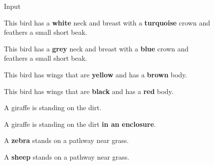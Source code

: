 \documentclass{article}
\begin{document}
\begin{figure}[t]
\begin{minipage}{0.12\textwidth}\raggedright
\scriptsize{Input}\\
\end{minipage}
\quad\begin{minipage}{0.10\textwidth}
\centering
\tiny{This bird has a \textbf{white} neck and breast with a \textbf{turquoise} crown and feathers a small short beak.}
\end{minipage}
\noindent\begin{minipage}{0.10\textwidth}
\centering
\tiny{This bird has a \textbf{grey} neck and breast with a \textbf{blue} crown and feathers a small short beak.}
\end{minipage}
\noindent\begin{minipage}{0.10\textwidth}
\centering
\tiny{This bird has wings that are \textbf{yellow} and has a \textbf{brown} body.}
\end{minipage}
\noindent\begin{minipage}{0.10\textwidth}
\centering
\tiny{This bird has wings that are \textbf{black} and has a \textbf{red} body.}
\end{minipage}
\noindent\begin{minipage}{0.10\textwidth}
\centering
\tiny{A giraffe is standing on the dirt.}
\end{minipage}
\noindent\begin{minipage}{0.10\textwidth}
\centering
\tiny{A giraffe is standing on the dirt \textbf{in an enclosure}.}
\end{minipage}
\noindent\begin{minipage}{0.10\textwidth}
\centering
\tiny{A \textbf{zebra} stands on a pathway near grass.}
\end{minipage}
\noindent\begin{minipage}{0.10\textwidth}
\centering
\tiny{A \textbf{sheep} stands on a pathway near grass.}
\end{minipage}
\smallskip


\end{figure}
\end{document}
